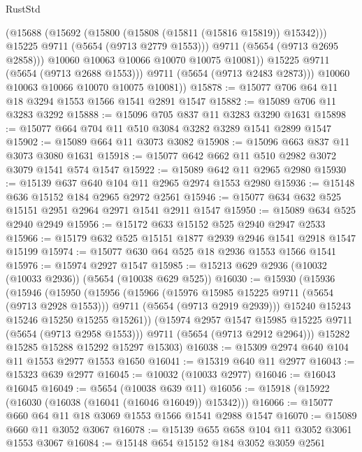 \begin{lexlean}{RustStd}
\begin{coremodule}
                  (@15688
                    (@15692 (@15800 (@15808 (@15811 (@15816 @15819)) @15342)))
                    @15225
                    @9711
                    (@5654 (@9713 @2779 @1553)))
                  @9711
                  (@5654 (@9713 @2695 @2858)))
                @10060
                @10063
                @10066
                @10070
                @10075
                @10081))
            @15225
            @9711
            (@5654 (@9713 @2688 @1553)))
          @9711
          (@5654 (@9713 @2483 @2873)))
        @10060
        @10063
        @10066
        @10070
        @10075
        @10081))
@15878 := @15077 @706 @64 @11 @18 @3294 @1553 @1566 @1541 @2891 @1547
@15882 := @15089 @706 @11 @3283 @3292
@15888 := @15096 @705 @837 @11 @3283 @3290 @1631
@15898 := @15077 @664 @704 @11 @510 @3084 @3282 @3289 @1541 @2899 @1547
@15902 := @15089 @664 @11 @3073 @3082
@15908 := @15096 @663 @837 @11 @3073 @3080 @1631
@15918 := @15077 @642 @662 @11 @510 @2982 @3072 @3079 @1541 @574 @1547
@15922 := @15089 @642 @11 @2965 @2980
@15930 := @15139 @637 @640 @104 @11 @2965 @2974 @1553 @2980
@15936 := @15148 @636 @15152 @184 @2965 @2972 @2561
@15946 := @15077 @634 @632 @525 @15151 @2951 @2964 @2971 @1541 @2911 @1547
@15950 := @15089 @634 @525 @2940 @2949
@15956 := @15172 @633 @15152 @525 @2940 @2947 @2533
@15966 := @15179 @632 @525 @15151 @1877 @2939 @2946 @1541 @2918 @1547 @15199
@15974 := @15077 @630 @64 @525 @18 @2936 @1553 @1566 @1541
@15976 := @15974 @2927 @1547
@15985 := @15213 @629 @2936 (@10032 (@10033 @2936)) (@5654 (@10038 @629 @525))
@16030 := @15930
    (@15936
      (@15946
        (@15950
          (@15956
            (@15966
              (@15976 @15985 @15225 @9711 (@5654 (@9713 @2928 @1553)))
              @9711
              (@5654 (@9713 @2919 @2939)))
            @15240
            @15243
            @15246
            @15250
            @15255
            @15261))
        (@15974 @2957 @1547 @15985 @15225 @9711 (@5654 (@9713 @2958 @1553)))
        @9711
        (@5654 (@9713 @2912 @2964)))
      @15282
      @15285
      @15288
      @15292
      @15297
      @15303)
@16038 := @15309 @2974 @640 @104 @11 @1553 @2977 @1553 @1650
@16041 := @15319 @640 @11 @2977
@16043 := @15323 @639 @2977
@16045 := @10032 (@10033 @2977)
@16046 := @16043 @16045
@16049 := @5654 (@10038 @639 @11)
@16056 := @15918 (@15922 (@16030 (@16038 (@16041 (@16046 @16049)) @15342)))
@16066 := @15077 @660 @64 @11 @18 @3069 @1553 @1566 @1541 @2988 @1547
@16070 := @15089 @660 @11 @3052 @3067
@16078 := @15139 @655 @658 @104 @11 @3052 @3061 @1553 @3067
@16084 := @15148 @654 @15152 @184 @3052 @3059 @2561

\end{coremodule}
\end{lexlean}
